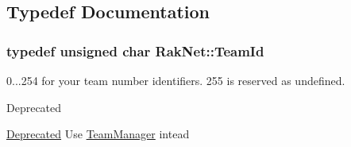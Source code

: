\subsection{Typedef Documentation}
\hypertarget{group___t_e_a_m___b_a_l_a_n_c_e_r___g_r_o_u_p_ga79c7825649955f28135498fb3d9f6894}{
\subsubsection[{Team\-Id}]{\setlength{\rightskip}{0pt plus 5cm}typedef unsigned char {\bf Rak\-Net\-::\-Team\-Id}}}\label{group___t_e_a_m___b_a_l_a_n_c_e_r___g_r_o_u_p_ga79c7825649955f28135498fb3d9f6894}
0...254 for your team number identifiers. 255 is reserved as undefined. \begin{DoxyRefDesc}{Deprecated}
\item[\hyperlink{deprecated__deprecated000011}{Deprecated}]Use \hyperlink{class_rak_net_1_1_team_manager}{Team\-Manager} intead \end{DoxyRefDesc}
